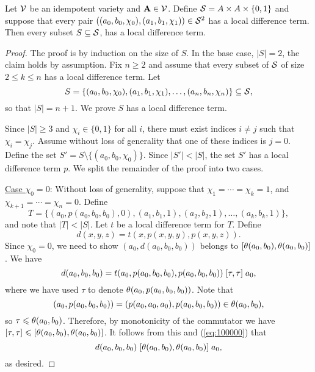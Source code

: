 \begin{thm}
  \label{thm:local-diff-terms}
  Let $\mathcal{V}$ be an idempotent variety and
  $\mathbf{A} \in \mathcal{V}$. Define
  $\mathcal{S}= A \times A \times \{0,1\}$
  and suppose that every pair
  $((a_0, b_0, \chi_0), (a_1, b_1, \chi_1)) \in \mathcal{S}^2$
  has a local difference term.
  Then every subset $S \subseteq \mathcal{S}$,
  has a local difference term.
\end{thm}
\begin{proof}
The proof is by induction on the size of $S$.  In the base case, $|S| = 2$,
the claim holds by assumption.
Fix $n\geq 2$ and assume that every subset of $\mathcal{S}$ of size $2\leq k \leq n$ has a local
difference term. Let
\[
S = \{(a_0, b_0, \chi_0), (a_1, b_1, \chi_1), \dots, (a_{n}, b_{n},\chi_{n})\} \subseteq \mathcal{S},\]
so that $|S| = n+1$.  We prove $S$ has a local difference term.

Since $|S| \geq 3$ and $\chi_i \in \{0,1\}$ for all $i$, there must exist
indices $i\neq j$ such that $\chi_i = \chi_j$. Assume without loss of generality
that one of these indices is $j=0$.  Define
the set
$S' = S \setminus \{(a_0, b_0, \chi_0)\}$.
Since $|S'| < |S|$, the set $S'$ has a local difference term $p$.
We split the remainder of the proof into two cases.

\vskip3mm

\noindent \underline{Case $\chi_0 = 0$}:
Without loss of generality, suppose that $\chi_1 = %
\cdots =\chi_k = 1$,
and $\chi_{k+1} %
= \cdots = \chi_{n} = 0$. Define %
\[T = \{(a_0, p(a_0, b_0, b_0), 0),
(a_1, b_1, 1), (a_2, b_2, 1), 
\dots, (a_k, b_k, 1)\},\] and 
note that $|T| < |S|$.
Let $t$ be a local difference term for $T$.
Define
\[
d(x,y,z) = t(x, p(x,y,y), p(x,y,z)).
\]
Since $\chi_0 =0$, we need to show
$(a_0, d(a_0,b_0,b_0))$ belongs to $\mathrel{[\theta(a_0,b_0), \theta(a_0,b_0)]}$.
We have
\begin{equation}
    \label{eq:100000}
  d(a_0,b_0,b_0) =
  t(a_0, p(a_0,b_0,b_0), p(a_0,b_0,b_0))\mathrel{[\tau, \tau]} a_0,
\end{equation}
where we have used $\tau$ to denote $\theta(a_0, p(a_0,b_0,b_0))$.
Note that
\[(a_0, p(a_0,b_0,b_0)) = (p(a_0,a_0,a_0), p(a_0,b_0,b_0)) \in \theta(a_0, b_0),\]
so $\tau\leqslant \theta(a_0,b_0)$. Therefore,
by monotonicity of the commutator we have
$\mathrel{[\tau, \tau]} {\leqslant} \mathrel{[\theta(a_0,b_0), \theta(a_0,b_0)]}$.
It follows from this and (\ref{eq:100000}) that
\[d(a_0,b_0,b_0)\mathrel{[\theta(a_0,b_0), \theta(a_0,b_0)]} a_0,\]
as desired.


\end{proof}
